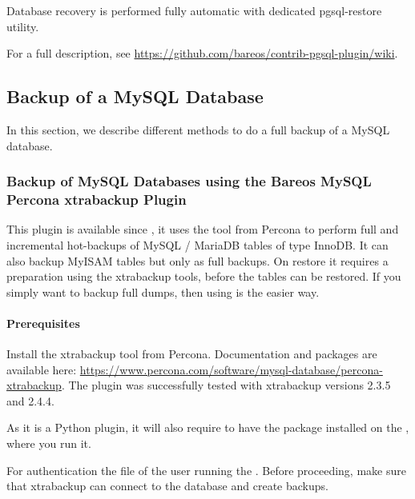 Database recovery is performed fully automatic with dedicated pgsql-restore utility.

For a full description, see \url{https://github.com/bareos/contrib-pgsql-plugin/wiki}.



\subsection{Backup of a MySQL Database}
\label{backup-mysql}

In this section, we describe different methods to do a full backup of a MySQL database.

\subsubsection{Backup of MySQL Databases using the Bareos MySQL Percona xtrabackup Plugin}
\label{backup-mysql-xtrabackup}

This plugin is available since ,
it uses the  tool from Percona to perform full and incremental hot-backups of MySQL / MariaDB tables of type InnoDB.
It can also backup MyISAM tables but only as full backups. On restore it requires a preparation using the xtrabackup tools, before the tables can be restored. 
If you simply want to backup full dumps, then using  is the easier way.

\paragraph{Prerequisites}

Install the xtrabackup tool from Percona. Documentation and packages are available here: \url{https://www.percona.com/software/mysql-database/percona-xtrabackup}.
The plugin was successfully tested with xtrabackup versions 2.3.5 and 2.4.4.

As it is a Python plugin,
it will also require to have the package  installed on the \bareosFd, where you run it.

For authentication the  file of the user running the \bareosFd.
Before proceeding, make sure that xtrabackup can connect to the database and create backups.

